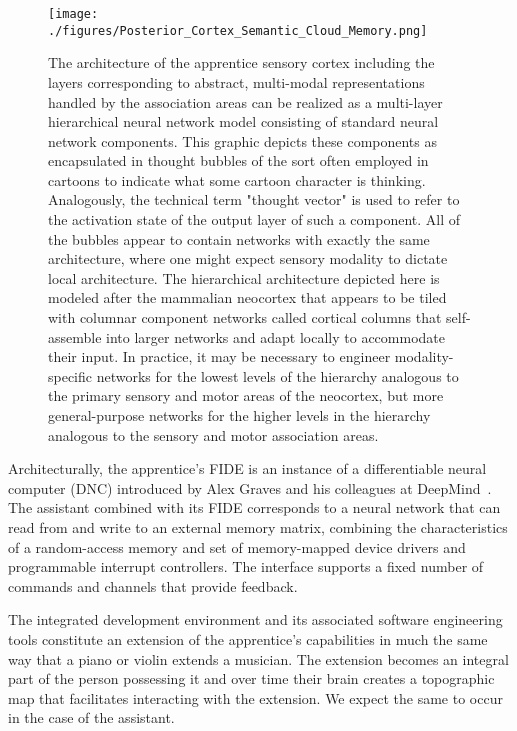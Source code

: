 
\begin{figure}
%
  \begin{center} 
    \texttt{[image: ./figures/Posterior\_Cortex\_Semantic\_Cloud\_Memory.png]} %
  \end{center}
%
  \caption{The architecture of the apprentice sensory cortex including the layers corresponding to abstract, multi-modal representations handled by the association areas can be realized as a multi-layer hierarchical neural network model consisting of standard neural network components. This graphic depicts these components as encapsulated in thought bubbles of the sort often employed in cartoons to indicate what some cartoon character is thinking. Analogously, the technical term "thought vector" is used to refer to the activation state of the output layer of such a component. All of the bubbles appear to contain networks with exactly the same architecture, where one might expect sensory modality to dictate local architecture. The hierarchical architecture depicted here is modeled after the mammalian neocortex that appears to be tiled with columnar component networks called cortical columns that self-assemble into larger networks and adapt locally to accommodate their input. In practice, it may be necessary to engineer modality-specific networks for the lowest levels of the hierarchy \emdash{} analogous to the primary sensory and motor areas of the neocortex, but more general-purpose networks for the higher levels in the hierarchy \emdash{} analogous to the sensory and motor association areas.}
%
  \label{fig_posterior}
%
\end{figure}


Architecturally, the apprentice's FIDE is an instance of a differentiable neural computer (DNC) introduced by Alex Graves and his colleagues at DeepMind~\cite{GravesetalNATURE-16}. The assistant combined with its FIDE corresponds to a neural network that can read from and write to an external memory matrix, combining the characteristics of a random-access memory and set of memory-mapped device drivers and programmable interrupt controllers. The interface supports a fixed number of commands and channels that provide feedback.

The integrated development environment and its associated software engineering tools constitute an extension of the apprentice’s capabilities in much the same way that a piano or violin extends a musician. The extension becomes an integral part of the person possessing it and over time their brain creates a topographic map that facilitates interacting with the extension. We expect the same to occur in the case of the assistant. 

